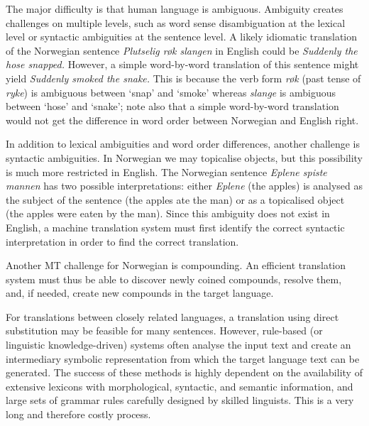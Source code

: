 \begin{multicols}{2}
The major difficulty is that human language is ambiguous. Ambiguity creates challenges on multiple levels, such as word sense disambiguation at the lexical level or syntactic ambiguities at the sentence level. 
A likely idiomatic translation of the Norwegian sentence \textit{Plutselig røk slangen} in English could be \textit{Suddenly the hose snapped.}
However, a simple word-by-word translation of this sentence might yield \textit{Suddenly smoked the snake.}
This is because the verb form \textit{røk} (past tense of \textit{ryke}) is ambiguous between `snap' and `smoke' whereas \textit{slange} is ambiguous between `hose' and `snake'; note also that a simple word-by-word translation would not get the difference in word order between Norwegian and English right.

In addition to lexical ambiguities and word order differences, another challenge is syntactic ambiguities. 
In Norwegian we may topicalise objects, but this possibility is much more restricted in English. 
The Norwegian sentence \textit{Eplene spiste mannen} has two possible interpretations: either \textit{Eplene} (the apples) is analysed as the subject of the sentence (the apples ate the man) or as a topicalised object (the apples were eaten by the man). 
Since this ambiguity does not exist in English, a machine translation system must first identify the correct syntactic interpretation in order to find the correct translation. 

Another MT challenge for Norwegian is compounding. 
An efficient translation system must thus be able to discover newly coined compounds, resolve them, and, if needed, create new compounds in the target language. 

For translations between closely related languages, a translation using direct substitution may be feasible for many sentences. However, rule-based (or linguistic knowledge-driven) systems often analyse the input text and create an intermediary symbolic representation from which the target language text can be generated. The success of these methods is highly dependent on the availability of extensive lexicons with morphological, syntactic, and semantic information, and large sets of grammar rules carefully designed by skilled linguists. This is a very long and therefore costly process.


\end{multicols}
